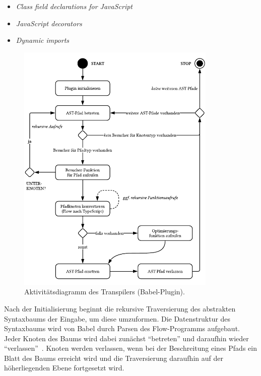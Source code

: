 \begin{itemize}
  \item \textit{Class field declarations for JavaScript}~\autocite{ES_PROPOSAL:CLASS_FIELDS}
  \item \textit{JavaScript decorators}~\autocite{ES_PROPOSAL:DECORATORS}
  \item \textit{Dynamic imports}~\autocite{ES_PROPOSAL:DYNAMIC_IMPORTS}
\end{itemize}

\begin{figure}[p]
  \centering
  \includegraphics[width=0.85\textwidth]{src/4_Umsetzung/fig/activity-diagram-plugin.pdf}
  \caption{Aktivitätsdiagramm des Transpilers (Babel-Plugin).}
  \label{fig:activity-diagram-plugin}
\end{figure}

Nach der Initialisierung beginnt die rekursive Traversierung des abstrakten Syntaxbaums der Eingabe, um diese umzuformen. Die Datenstruktur des Syntaxbaums wird von Babel durch Parsen des Flow-Programms aufgebaut. Jeder Knoten des Baums wird dabei zunächst \enquote{betreten} und daraufhin wieder \enquote{verlassen}~\autocite{BABEL:HANDBOOK}. Knoten werden verlassen, wenn bei der Beschreitung eines Pfads ein Blatt des Baums erreicht wird und die Traversierung daraufhin auf der höherliegenden Ebene fortgesetzt wird.

